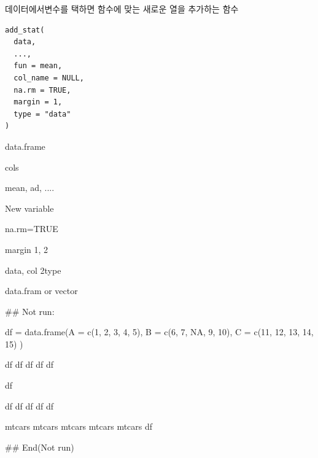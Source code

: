 \documentclass[a4paper]{book}
\begin{document}
%
\begin{Description}
데이터에서변수를 택하면 함수에 맞는 새로운 열을 추가하는 함수
\end{Description}
%
\begin{Usage}
\begin{verbatim}
add_stat(
  data,
  ...,
  fun = mean,
  col_name = NULL,
  na.rm = TRUE,
  margin = 1,
  type = "data"
)
\end{verbatim}
\end{Usage}
%
\begin{Arguments}
\begin{ldescription}
\item[\code{data}] data.frame

\item[\code{...}] cols

\item[\code{fun}] mean, ad, ....

\item[\code{col\_name}] New variable

\item[\code{na.rm}] na.rm=TRUE

\item[\code{margin}] margin 1, 2

\item[\code{type}] data, col 2type
\end{ldescription}
\end{Arguments}
%
\begin{Value}
data.fram or vector
\end{Value}
%
\begin{Examples}
\begin{ExampleCode}

\#\# Not run: 

df = data.frame(A = c(1, 2, 3, 4, 5), B = c(6, 7, NA, 9, 10), C = c(11, 12, 13, 14, 15) )

df%
df%
df %
df %
df %

df %

df %
df %
df %
df %
df %

mtcars %
mtcars %
mtcars %
mtcars %
mtcars %
df


## End(Not run)


\end{ExampleCode}
\end{Examples}
\end{document}
